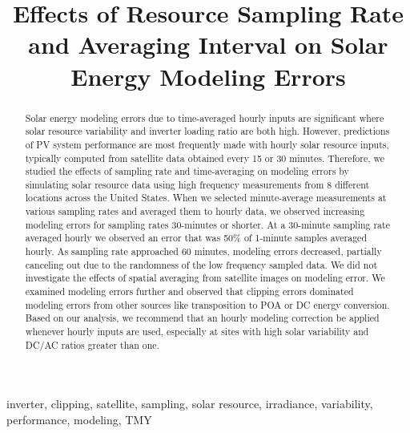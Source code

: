 \documentclass[conference]{IEEEtran}
\begin{document}
\title{Effects of Resource Sampling Rate and Averaging Interval on Solar Energy Modeling Errors}

\author{
}

\maketitle

\begin{abstract}
Solar energy modeling errors due to time-averaged hourly inputs are significant where solar resource variability and inverter loading ratio are both high. However, predictions of PV system performance are most frequently made with hourly solar resource inputs, typically computed from satellite data obtained every 15 or 30 minutes. Therefore, we studied the effects of sampling rate and time-averaging on modeling errors by simulating solar resource data using high frequency measurements from 8 different locations across the United States. When we selected minute-average measurements at various sampling rates and averaged them to hourly data, we observed increasing modeling errors for sampling rates 30-minutes or shorter. At a 30-minute sampling rate averaged hourly we observed an error that was 50\% of 1-minute samples averaged hourly. As sampling rate approached 60 minutes, modeling errors decreased, partially canceling out due to the randomness of the low frequency sampled data. We did not investigate the effects of spatial averaging from satellite images on modeling error. We examined modeling errors further and observed that clipping errors dominated modeling errors from other sources like transposition to POA or DC energy conversion. Based on our analysis, we recommend that an hourly modeling correction be applied whenever hourly inputs are used, especially at sites with high solar variability and DC/AC ratios greater than one.
\end{abstract}

\begin{IEEEkeywords}
inverter, clipping, satellite, sampling, solar resource, irradiance, variability, performance, modeling, TMY
\end{IEEEkeywords}
\end{document}

